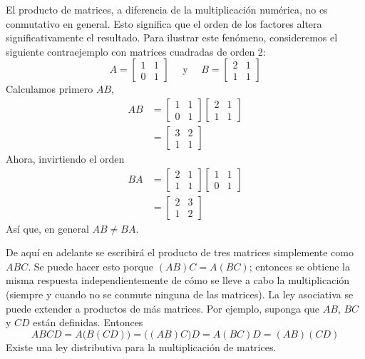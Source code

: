 El producto de matrices, a diferencia de la multiplicación numérica, no es conmutativo en general. Esto significa que el orden de los factores altera significativamente el resultado. Para ilustrar este fenómeno, consideremos el siguiente contraejemplo con matrices cuadradas de orden 2:
$$A = \begin{bmatrix}
    1 & 1 \\
    0 & 1
\end{bmatrix} \quad \text{ y } \quad B = \begin{bmatrix}
    2 & 1 \\
    1 & 1
\end{bmatrix}$$
Calculamos primero $AB$,
\begin{align*}
    AB & = \begin{bmatrix}
        1 & 1 \\
        0 & 1
    \end{bmatrix} \begin{bmatrix}
        2 & 1 \\
        1 & 1
    \end{bmatrix} \\
    & = \begin{bmatrix}
        3 & 2 \\
        1 & 1
    \end{bmatrix}
\end{align*}
Ahora, invirtiendo el orden
\begin{align*}
    BA & = \begin{bmatrix}
        2 & 1 \\
        1 & 1
    \end{bmatrix} \begin{bmatrix}
        1 & 1 \\
        0 & 1
    \end{bmatrix} \\
    & = \begin{bmatrix}
        2 & 3 \\
        1 & 2
    \end{bmatrix}
\end{align*}
Así que, en general $AB \neq BA$.

De aquí en adelante se escribirá el producto de tres matrices simplemente como $ABC$. Se puede hacer esto porque $(AB)C = A(BC)$; entonces se obtiene la misma respuesta independientemente de cómo se lleve a cabo la multiplicación (siempre y cuando no se conmute ninguna de las matrices). La ley asociativa se puede extender a productos de más matrices. Por ejemplo, suponga que $AB$, $BC$ y $CD$ están definidas. Entonces
$$ABCD = A\big(B(CD)\big) = \big((AB)C\big)D = A(BC)D = (AB)(CD)$$
Existe una ley distributiva para la multiplicación de matrices.

